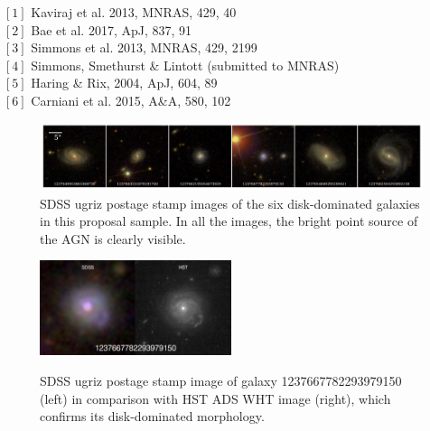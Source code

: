 \documentclass[12pt]{article}
\begin{document}
\vspace{0.5em}


\noindent
$[1]$ Kaviraj et al. 2013, MNRAS, 429, 40
\\
$[2]$ Bae et al. 2017, ApJ, 837, 91
\\
$[3]$ Simmons et al. 2013, MNRAS, 429, 2199 
\\
$[4]$ Simmons, Smethurst \& Lintott (submitted to MNRAS)
\\
$[5]$ Haring \& Rix, 2004, ApJ, 604, 89
\\
$[6]$ Carniani et al. 2015, A\&A, 580, 102

\begin{figure}[h]
\includegraphics[width=\textwidth]{mosaic_6_2017B_obs.png}
\caption{SDSS ugriz postage stamp images of the six disk-dominated galaxies in this proposal sample. In all the images, the bright point source of the AGN is clearly visible.}
\end{figure}

\begin{figure} [h]
\includegraphics[width=0.5\textwidth]{fig3.png} \\
\caption{SDSS ugriz postage stamp image of galaxy 1237667782293979150 (left) in comparison with HST ADS WHT image (right), which confirms its disk-dominated morphology.}
\end{figure}
\end{document}
